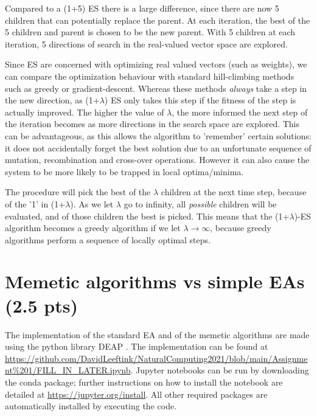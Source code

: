 \documentclass{article}
\begin{document}
Compared to a (1+5) ES there is a large difference, since there are now 5 children that can potentially replace the parent. At each iteration, the best of the 5 children and parent is chosen to be the new parent. With 5 children at each iteration, 5 directions of search in the real-valued vector space are explored.

Since ES are concerned with optimizing real valued vectors (such as weights), we can compare the optimization behaviour with standard hill-climbing methods such as greedy or gradient-descent. Whereas these methods \textit{always} take a step in the new direction, as (1+$\lambda$) ES only takes this step if the fitness of the step is actually improved. The higher the value of $\lambda$, the more informed the next step of the iteration becomes as more directions in the search space are explored. This can be advantageous, as this allows the algorithm to 'remember' certain solutions: it does not accidentally forget the best solution due to an unfortunate sequence of mutation, recombination and cross-over operations. However it can also cause the system to be more likely to be trapped in local optima/minima. 

The procedure will pick the best of the $\lambda$ children at the next time step, because of the '1' in (1+$\lambda$). As we let $\lambda$ go to infinity, all \textit{possible} children will be evaluated, and of those children the best is picked. This means that the (1+$\lambda$)-ES algorithm becomes a greedy algorithm if we let $\lambda \to \infty$, because greedy algorithms perform a sequence of locally optimal steps. 


\section{Memetic algorithms vs simple EAs (2.5 pts)}
The implementation of the standard EA and of the memetic algorithms are made using the python library DEAP \cite{deap}. The implementation can be found at \url{https://github.com/DavidLeeftink/NaturalComputing2021/blob/main/Assignment\%201/FILL_IN_LATER.ipynb}. Jupyter notebooks can be run by downloading the conda package; further instructions on how to install the notebook are detailed at \url{https://jupyter.org/install}. All other required packages are automatically installed by executing the code.
\end{document}
